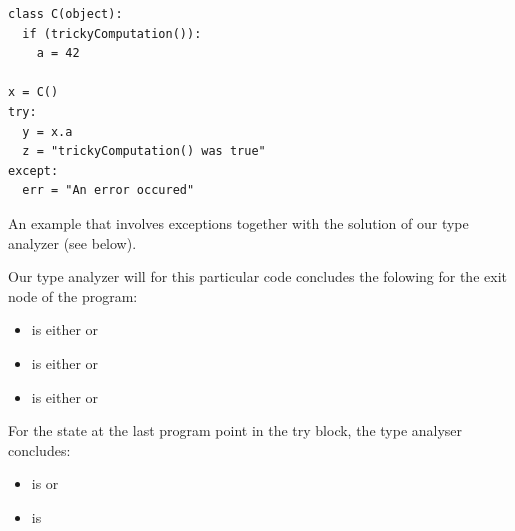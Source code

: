 \begin{listing}[H]
	\begin{verbatim}
class C(object):
  if (trickyComputation()):
    a = 42

x = C()
try:
  y = x.a
  z = "trickyComputation() was true"
except:
  err = "An error occured"
	\end{verbatim}
	\caption{An example that involves exceptions together with the solution of our type analyzer (see below).}
\end{listing}

Our type analyzer will for this particular code concludes the folowing for the exit node of the program:

\begin{itemize}
	\item {} is either  or 
	\item {} is either  or 
	\item {} is either  or 
\end{itemize}

For the state at the last program point in the try block, the type analyser concludes:

\begin{itemize}
	\item {} is  or 
	\item {} is 
\end{itemize}
